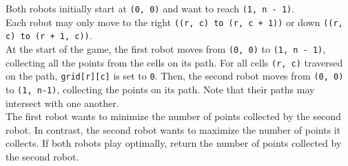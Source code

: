Both robots initially start at {\colorbox{CodeBackground}{\lstinline|(0, 0)|}} and want to reach {\colorbox{CodeBackground}{\lstinline|(1, n - 1)|}}. \\

Each robot may only move to the right {\colorbox{CodeBackground}{\lstinline|((r, c) to (r, c + 1))|}} or down {\colorbox{CodeBackground}{\lstinline|((r, c) to (r + 1, c))|}}.\\

At the start of the game, the first robot moves from {\colorbox{CodeBackground}{\lstinline|(0, 0)|}} to {\colorbox{CodeBackground}{\lstinline|(1, n - 1)|}}, collecting all the points from the cells on its path. For all cells {\colorbox{CodeBackground}{\lstinline|(r, c)|}} traversed on the path, {\colorbox{CodeBackground}{\lstinline|grid[r][c]|}} is set to {\colorbox{CodeBackground}{\lstinline|0|}}. Then, the second robot moves from {\colorbox{CodeBackground}{\lstinline|(0, 0)|}} to {\colorbox{CodeBackground}{\lstinline|(1, n-1)|}}, collecting the points on its path. Note that their paths may intersect with one another.\\

The first robot wants to minimize the number of points collected by the second robot. In contrast, the second robot wants to maximize the number of points it collects. If both robots play optimally, return the number of points collected by the second robot.

